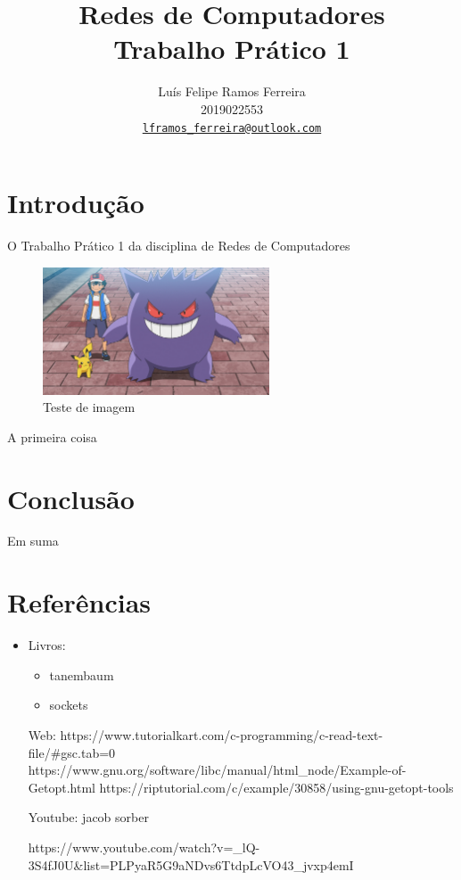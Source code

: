 \documentclass{article}
\title{Redes de Computadores \\ Trabalho Prático 1}
\author{Luís Felipe Ramos Ferreira \\ 2019022553 \\
    \href{mailto:lframos_ferreira@outlook.com}{\texttt{lframos\_ferreira@outlook.com}}}
\begin{document}
\maketitle

\section{Introdução}

O Trabalho Prático 1 da disciplina de Redes de Computadores

\begin{figure}[H]
    \centering
    \includegraphics[width=0.6\textwidth]{images/gengar.png}
    \caption{Teste de imagem}
\end{figure}

A primeira coisa

\section{Conclusão}

Em suma

\section{Referências}

\begin{itemize}
    \item Livros:
          \begin{itemize}
              \item tanembaum
              \item sockets
          \end{itemize}

          Web:
          https://www.tutorialkart.com/c-programming/c-read-text-file/#gsc.tab=0
          https://www.gnu.org/software/libc/manual/html_node/Example-of-Getopt.html
          https://riptutorial.com/c/example/30858/using-gnu-getopt-tools

          Youtube:
          jacob sorber

          https://www.youtube.com/watch?v=_lQ-3S4fJ0U&list=PLPyaR5G9aNDvs6TtdpLcVO43_jvxp4emI
\end{itemize}
\end{document}
